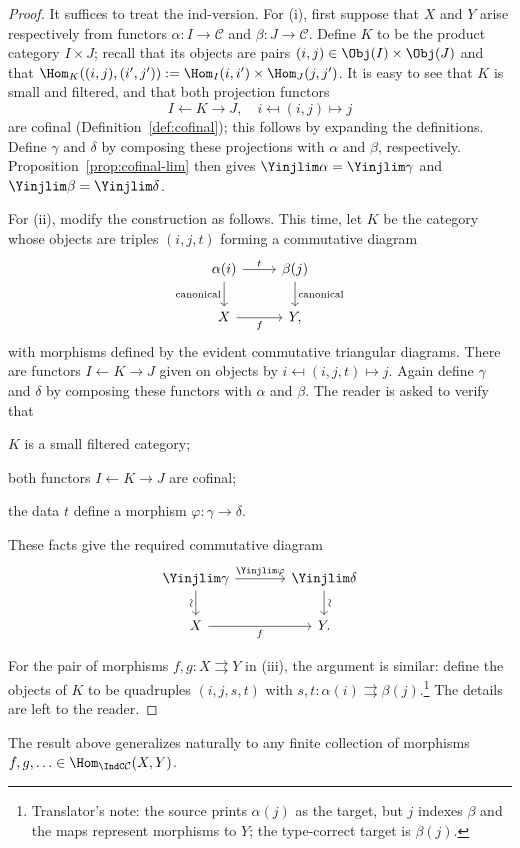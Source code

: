 \begin{proof}
	It suffices to treat the ind-version. For (i), first suppose that $X$ and $Y$ arise respectively from functors $\alpha:I\to\mathcal{C}$ and $\beta:J\to\mathcal{C}$. Define $K$ to be the product category $I\times J$; recall that its objects are pairs $(i,j)\in\Obj(I)\times\Obj(J)$ and that
	$\Hom_K((i,j),(i',j')):=\Hom_I(i,i')\times\Hom_J(j,j')$.
	It is easy to see that $K$ is small and filtered, and that both projection functors
	\[ I \leftarrow K \rightarrow J, \quad i \mapsfrom (i, j) \mapsto j \]
	are cofinal (Definition~\ref{def:cofinal}); this follows by expanding the definitions. Define $\gamma$ and $\delta$ by composing these projections with $\alpha$ and $\beta$, respectively. Proposition~\ref{prop:cofinal-lim} then gives
	$\Yinjlim\alpha=\Yinjlim\gamma$ and
	$\Yinjlim\beta=\Yinjlim\delta$.

	For (ii), modify the construction as follows. This time, let $K$ be the category whose objects are triples $(i,j,t)$ forming a commutative diagram
	\[\begin{tikzcd}
		\alpha(i) \arrow[d, "\text{canonical}"'] \arrow[r, "t"] & \beta(j) \arrow[d, "\text{canonical}"] \\
		X \arrow[r, "f"'] & Y,
	\end{tikzcd}\]
	with morphisms defined by the evident commutative triangular diagrams. There are functors $I\leftarrow K\rightarrow J$ given on objects by
	$i\mapsfrom(i,j,t)\mapsto j$. Again define $\gamma$ and $\delta$ by composing these functors with $\alpha$ and $\beta$. The reader is asked to verify that
	\begin{compactitem}
		\item $K$ is a small filtered category;
		\item both functors $I\leftarrow K\rightarrow J$ are cofinal;
		\item the data $t$ define a morphism $\varphi:\gamma\to\delta$.
	\end{compactitem}

	These facts give the required commutative diagram
	\[\begin{tikzcd}[column sep=large]
		\Yinjlim \gamma \arrow[r, "{\Yinjlim \varphi}"] \arrow[d, "\sim"' sloped] & \Yinjlim \delta \arrow[d, "\sim" sloped] \\
		X \arrow[r, "f"'] & Y.
	\end{tikzcd}\]

	For the pair of morphisms $f,g:X\rightrightarrows Y$ in (iii), the argument is similar: define the objects of $K$ to be quadruples $(i,j,s,t)$ with
	$s,t:\alpha(i)\rightrightarrows\beta(j)$.\footnote{Translator's note: the source prints $\alpha(j)$ as the target, but $j$ indexes $\beta$ and the maps represent morphisms to $Y$; the type-correct target is $\beta(j)$.} The details are left to the reader.
\end{proof}

The result above generalizes naturally to any finite collection of morphisms
$f,g,\ldots\in\Hom_{\IndC\mathcal{C}}(X,Y)$.
